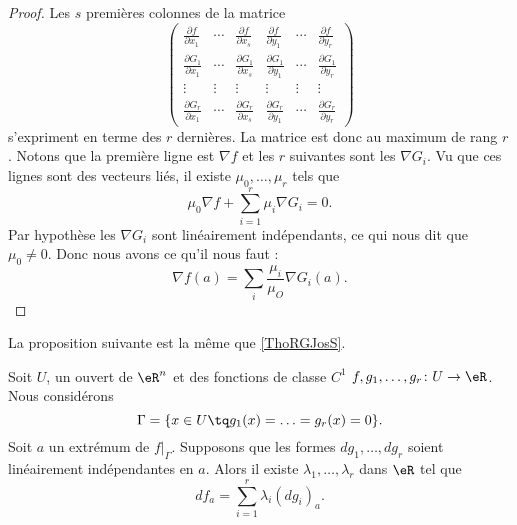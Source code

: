 \begin{proof}
    Les \( s\) premières colonnes de la matrice
    \begin{equation}
        \begin{pmatrix}
            \frac{ \partial f }{ \partial x_1 }   &   \cdots    &   \frac{ \partial f }{ \partial x_s }    &   \frac{ \partial f }{ \partial y_1 }    &   \cdots    &   \frac{ \partial f }{ \partial y_r }\\  
            \frac{ \partial G_1 }{ \partial x_1 }    &   \cdots    &   \frac{ \partial G_1 }{ \partial x_s }    &   \frac{ \partial G_1 }{ \partial y_1 }    &   \cdots    &   \frac{ \partial G_1 }{ \partial y_r }\\
            \vdots    &   \vdots    &   \vdots    &   \vdots    &   \vdots    &   \vdots\\
            \frac{ \partial G_r }{ \partial x_1 }    &   \cdots    &   \frac{ \partial G_r }{ \partial x_s }    &   \frac{ \partial G_r }{ \partial y_1 }    &  \cdots   & \frac{ \partial G_r }{ \partial y_r }  
        \end{pmatrix}
    \end{equation}
    s'expriment en terme des \( r\) dernières. La matrice est donc au maximum de rang \( r\). Notons que la première ligne est \( \nabla f\) et les \( r\) suivantes sont les \( \nabla G_i\). Vu que ces lignes sont des vecteurs liés, il existe \( \mu_0,\ldots, \mu_r\) tels que
    \begin{equation}
        \mu_0\nabla f+\sum_{i=1}^r\mu_i\nabla G_i=0.
    \end{equation}
    Par hypothèse les \( \nabla G_i\) sont linéairement indépendants, ce qui nous dit que \( \mu_0\neq 0\). Donc nous avons ce qu'il nous faut :
    \begin{equation}
        \nabla f(a)=\sum_i\frac{ \mu_i }{ \mu_O } \nabla G_i(a).
    \end{equation}
\end{proof}

La proposition suivante est la même que \ref{ThoRGJosS}.
\begin{proposition} \label{PropfPPUxh}
    Soit \( U\), un ouvert de \( \eR^n\) et des fonctions de classe \( C^1\) \( f,g_1,\ldots, g_r\colon U\to \eR\). Nous considérons
    \begin{equation}
        \Gamma=\{ x\in U\tq g_1(x)=\ldots=g_r(x)=0 \}.
    \end{equation}
    Soit \( a\) un extrémum de \( f|_{\Gamma}\). Supposons que les formes \( dg_1,\ldots, dg_r\) soient linéairement indépendantes en \( a\). Alors il existe \( \lambda_1,\ldots, \lambda_r\) dans \( \eR\) tel que
    \begin{equation}
        df_a=\sum_{i=1}^r\lambda_i(dg_i)_a.
    \end{equation}
\end{proposition}



